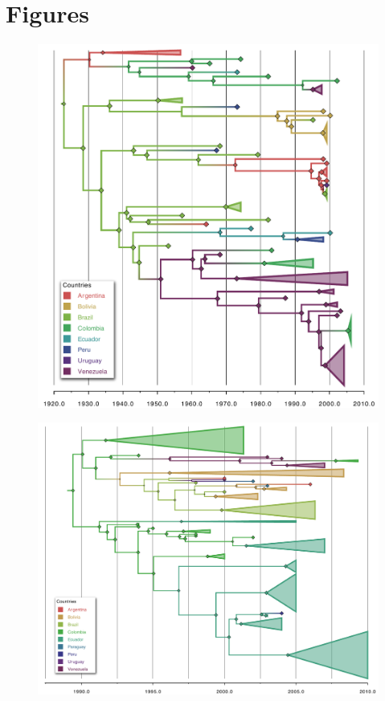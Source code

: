 \documentclass[10pt]{article}
\begin{document}
\section{Figures}
\begin{figure}[!ht]
\begin{center}
\includegraphics[scale=.85]{FIGURES/A.pdf}
\end{center}
\caption{}
\label{fig:Atree}
\end{figure}
\newpage
\begin{figure}[!ht]
\begin{center}
\includegraphics[scale=.60]{FIGURES/O.pdf}
\end{center}
\caption{}
\label{fig:Otree}
\end{figure}
\end{document}
